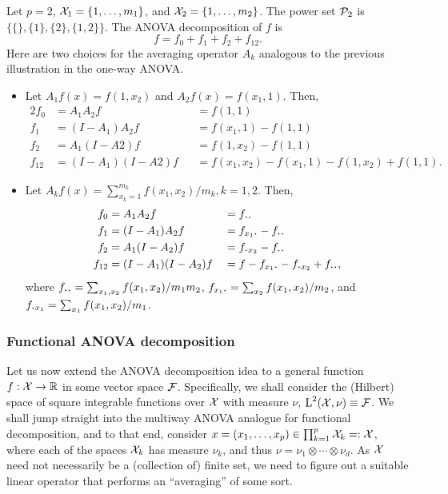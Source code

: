 \documentclass[a4paper,showframe,11pt,draft]{report}
\begin{document}
\begin{example}
  Let $p=2$, ${\mathcal X}_1=\{1,\dots,m_1\}$, and ${\mathcal X}_2=\{1,\dots,m_2\}$.
  The power set ${\mathcal P}_2$ is $\big\{ \{\}, \{1\}, \{2\}, \{1,2\} \big\}$.
  The ANOVA decomposition of $f$ is
  \[
    f = f_0 + f_1 + f_2 + f_{12}.
  \]
  Here are two choices for the averaging operator $A_k$ analogous to the previous illustration in the one-way ANOVA.
  \begin{itemize}
    \item Let $A_1f(x) = f(1,x_2)$ and $A_2f(x) = f(x_1,1)$. Then,
    \begin{alignat*}{2}
      f_0 &= A_1A_2 f          &&= f(1,1) \\
      f_1 &= (I-A_1)A_2f       &&= f(x_1,1) - f(1,1) \\
      f_2 &= A_1(I-A2)f        &&= f(1,x_2) - f(1,1) \\
      f_{12} &= (I-A_1)(I-A2)f &&= f(x_1,x_2) - f(x_1,1) - f(1,x_2) + f(1,1).
    \end{alignat*}
    \item Let $A_kf(x) = \sum_{x_k=1}^{m_k} f(x_1,x_2) / m_k, k=1,2$. Then,
    \begin{alignat*}{2}
      f_0 &= A_1A_2 f          &&= f_{\bigcdot\bigcdot} \\
      f_1 &= (I-A_1)A_2f       &&= f_{x_1\bigcdot} - f_{\bigcdot\bigcdot} \\
      f_2 &= A_1(I-A_2)f        &&= f_{\bigcdot x_2} - f_{\bigcdot\bigcdot} \\
      f_{12} &= (I-A_1)(I-A_2)f &&= f - f_{x_1\bigcdot} - f_{\bigcdot x_2} + f_{\bigcdot\bigcdot},
    \end{alignat*}
    where $f_{\bigcdot\bigcdot} = \sum_{x_1,x_2} f(x_1,x_2) / m_1m_2$, $ f_{x_1\bigcdot} = \sum_{x_2} f(x_1,x_2)/m_2$, and \newline $f_{\bigcdot x_1} = \sum_{x_1} f(x_1,x_2)/m_1$.
  \end{itemize}
\end{example}

\subsubsection{Functional ANOVA decomposition}

Let us now extend the ANOVA decomposition idea to a general function $f:{\mathcal X}\to\mathbb{R}$ in some vector space ${\mathcal F}$.
Specifically, we shall consider the (Hilbert) space of square integrable functions over ${\mathcal X}$ with measure $\nu$, $\text{L}^2({\mathcal X},\nu) \equiv {\mathcal F}$.
We shall jump straight into the multiway ANOVA analogue for functional decomposition, and to that end, consider $x=(x_1,\dots,x_p) \in \prod_{k=1}^p {\mathcal X}_k =: {\mathcal X}$, where each of the spaces ${\mathcal X}_k$ has measure $\nu_k$, and thus $\nu=\nu_1\otimes\cdots\otimes\nu_d$.
As ${\mathcal X}$ need not necessarily be a (collection of) finite set, we need to figure out a suitable linear operator that performs an ``averaging'' of some sort.
\end{document}
